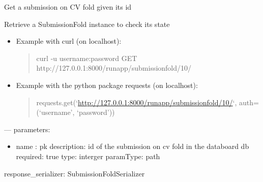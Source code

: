 \documentclass[letterpaper,10pt,english]{sphinxmanual}
\begin{document}

\begin{fulllineitems}
\label{modules/views:runapp.views.SubmissionFoldDetail}
Get a submission on CV fold given its id

\begin{fulllineitems}
\label{modules/views:runapp.views.SubmissionFoldDetail.get}
Retrieve a SubmissionFold instance to check its state
\begin{itemize}
\item {} 
Example with curl (on localhost):
\begin{quote}

curl -u username:password GET            http://127.0.0.1:8000/runapp/submissionfold/10/
\end{quote}

\item {} 
Example with the python package requests (on localhost):
\begin{quote}

requests.get(`\url{http://127.0.0.1:8000/runapp/submissionfold/10/}`,            auth=(`username', `password'))
\end{quote}

\end{itemize}

---
parameters:
\begin{itemize}
\item {} 
name : pk
description: id of the submission on cv fold in the databoard db
required: true
type: interger
paramType: path

\end{itemize}

response\_serializer: SubmissionFoldSerializer

\end{fulllineitems}


\end{fulllineitems}

\end{document}
